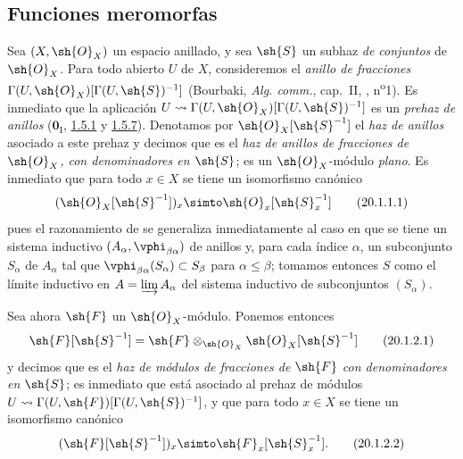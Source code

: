 \subsection{Funciones meromorfas}
\label{IV.20.1}

\begin{env}[20.1.1]
\label{IV.20.1.1}
Sea $(X,\sh{O}_X)$ un espacio anillado, y sea $\sh{S}$ un subhaz \emph{de conjuntos} de $\sh{O}_X$.
Para todo abierto $U$ de $X$, consideremos el \emph{anillo de fracciones} $\Gamma(U,\sh{O}_X)[\Gamma(U,\sh{S})^{-1}]$ (Bourbaki, \emph{Alg. comm.}, cap.~II, , n\textsuperscript{o}1).
Es inmediato que la aplicación $U\leadsto\Gamma(U,\sh{O}_X)[\Gamma(U,\sh{S})^{-1}]$ es un \emph{prehaz de anillos} ($\mathbf{0}_{\mathrm I}$, \hyperref[0.1.5.1]{1.5.1} y \hyperref[0.1.5.7]{1.5.7}).
Denotamos por $\sh{O}_X[\sh{S}^{-1}]$ el \emph{haz de anillos} asociado a este prehaz y decimos que es el \emph{haz de anillos de fracciones de $\sh{O}_X$, con denominadores en $\sh{S}$}; es un $\sh{O}_X$-módulo \emph{plano}.
Es inmediato que para todo $x\in X$ se tiene un isomorfismo canónico
\[
\label{IV.20.1.1.1}
  (\sh{O}_X[\sh{S}^{-1}])_x\simto\sh{O}_x[\sh{S}_x^{-1}]
  \tag{20.1.1.1}
\]
pues el razonamiento de  se generaliza inmediatamente al caso en que se tiene un sistema inductivo $(A_\alpha,\vphi_{\beta\alpha})$ de anillos y, para cada índice $\alpha$, un subconjunto $S_\alpha$ de $A_\alpha$ tal que
$\vphi_{\beta\alpha}(S_\alpha)\subset S_\beta$ para $\alpha\leq\beta$; tomamos entonces $S$ como el límite inductivo en $A=\varinjlim A_\alpha$ del sistema inductivo de subconjuntos $(S_\alpha)$.
\end{env}

\begin{env}[20.1.2]
\label{IV.20.1.2}
Sea ahora $\sh{F}$ un $\sh{O}_X$-módulo.
Ponemos entonces
\[
\label{IV.20.1.2.1}
  \sh{F}[\sh{S}^{-1}]=\sh{F}\otimes_{\sh{O}_X}\sh{O}_X[\sh{S}^{-1}]
  \tag{20.1.2.1}
\]
y decimos que es el \emph{haz de módulos de fracciones de $\sh{F}$ con denominadores en $\sh{S}$}; es inmediato que está asociado al prehaz de módulos $U\leadsto\Gamma(U,\sh{F})[\Gamma(U,\sh{S})^{-1}]$, y que para todo $x\in X$ se tiene un isomorfismo canónico
\[
\label{IV.20.1.2.2}
  (\sh{F}[\sh{S}^{-1}])_x\simto\sh{F}_x[\sh{S}_x^{-1}].
  \tag{20.1.2.2}
\]
\end{env}

